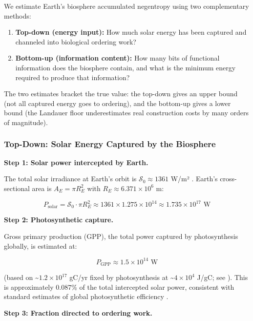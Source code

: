 \documentclass[11pt]{article}
\theoremstyle{plain}
\theoremstyle{definition}
\theoremstyle{remark}
\let\origsubsubsection\subsubsection
\renewcommand{\subsubsection}{\needspace{4\baselineskip}\origsubsubsection}
\providecommand{\tightlist}{%
  \setlength{\itemsep}{0pt}\setlength{\parskip}{0pt}}
\begin{document}
We estimate Earth's biosphere accumulated negentropy using two
complementary methods:

\begin{enumerate}
\def\labelenumi{\arabic{enumi}.}
\tightlist
\item
  \textbf{Top-down (energy input):} How much solar energy has been
  captured and channeled into biological ordering work?
\item
  \textbf{Bottom-up (information content):} How many bits of functional
  information does the biosphere contain, and what is the minimum energy
  required to produce that information?
\end{enumerate}

The two estimates bracket the true value: the top-down gives an upper
bound (not all captured energy goes to ordering), and the bottom-up
gives a lower bound (the Landauer floor underestimates real construction
costs by many orders of magnitude).

\subsubsection{Top-Down: Solar Energy Captured by the
Biosphere}\label{top-down-solar-energy-captured-by-the-biosphere}

\textbf{Step 1: Solar power intercepted by Earth.}

The total solar irradiance at Earth's orbit is
\(\mathcal{S}_0 \approx 1361\) W/m² \citep{Burch2021}. Earth's
cross-sectional area is \(A_E = \pi R_E^2\) with
\(R_E \approx 6.371 \times 10^6\) m:

\[P_{\text{solar}} = \mathcal{S}_0 \cdot \pi R_E^2 \approx 1361 \times 1.275 \times 10^{14} \approx 1.735 \times 10^{17} \text{ W}\]

\textbf{Step 2: Photosynthetic capture.}

Gross primary production (GPP), the total power captured by
photosynthesis globally, is estimated at:

\[P_{\text{GPP}} \approx 1.5 \times 10^{14} \text{ W}\]

(based on \textasciitilde{}\(1.2 \times 10^{17}\) gC/yr fixed by
photosynthesis at \textasciitilde{}\(4 \times 10^4\) J/gC; see
\citeyearpar{Beer2010}). This is approximately 0.087\% of the total
intercepted solar power, consistent with standard estimates of global
photosynthetic efficiency \citeyearpar{Beer2010}.

\textbf{Step 3: Fraction directed to ordering work.}
\end{document}
